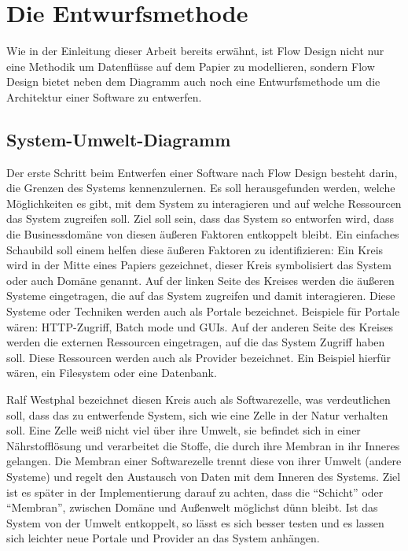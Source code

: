 \chapter{Die Entwurfsmethode}

Wie in der Einleitung dieser Arbeit bereits erwähnt, ist Flow Design nicht nur
eine Methodik um Datenflüsse auf dem Papier zu modellieren, sondern Flow Design
bietet neben dem Diagramm auch noch eine Entwurfsmethode um die Architektur einer Software
zu entwerfen.

\section{System-Umwelt-Diagramm}

Der erste Schritt beim Entwerfen einer Software nach Flow Design besteht
darin, die Grenzen des Systems kennenzulernen. Es soll herausgefunden
werden, welche Möglichkeiten es gibt, mit dem System zu interagieren und auf
welche Ressourcen das System zugreifen soll. Ziel soll sein, dass das System
so entworfen wird, dass die Businessdomäne von diesen äußeren Faktoren entkoppelt bleibt.
Ein einfaches Schaubild soll einem helfen diese äußeren Faktoren zu
identifizieren: Ein Kreis wird in der Mitte eines Papiers gezeichnet, dieser
Kreis symbolisiert das System oder auch Domäne genannt.
Auf der linken Seite des Kreises werden die äußeren Systeme eingetragen, die
auf das System zugreifen und damit interagieren. Diese Systeme oder
Techniken werden auch als Portale bezeichnet. Beispiele für Portale wären:
HTTP-Zugriff, Batch mode und GUIs.
Auf der anderen Seite des Kreises werden die externen Ressourcen eingetragen, auf die
das System Zugriff haben soll. Diese Ressourcen werden auch als Provider
bezeichnet. Ein Beispiel hierfür wären, ein Filesystem oder eine Datenbank.

Ralf Westphal bezeichnet diesen Kreis auch als Softwarezelle, was
verdeutlichen soll, dass das zu entwerfende System, sich wie eine Zelle in der
Natur verhalten soll. Eine Zelle weiß nicht viel über ihre Umwelt, sie befindet sich in
einer Nährstofflösung und verarbeitet die Stoffe, die durch ihre Membran in
ihr Inneres gelangen. Die Membran einer Softwarezelle trennt diese von
ihrer Umwelt (andere Systeme) und regelt den Austausch von Daten mit dem
Inneren des Systems. Ziel ist es später in der Implementierung darauf zu
achten, dass die \enquote{Schicht} oder \enquote{Membran}, zwischen Domäne und Außenwelt möglichst
dünn bleibt.
Ist das System von der Umwelt entkoppelt, so lässt es sich besser testen und es
lassen sich leichter neue Portale und Provider an das System anhängen.

